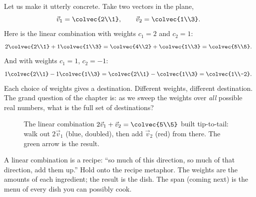Let us make it utterly concrete. Take two vectors in the plane,
\[
  \vec{v}_1 = \colvec{2\\1}, \qquad \vec{v}_2 = \colvec{1\\3}.
\]
Here is the linear combination with weights $c_1 = 2$ and $c_2 = 1$:
\[
  2\colvec{2\\1} + 1\colvec{1\\3}
  = \colvec{4\\2} + \colvec{1\\3}
  = \colvec{5\\5}.
\]
And with weights $c_1 = 1$, $c_2 = -1$:
\[
  1\colvec{2\\1} - 1\colvec{1\\3}
  = \colvec{2\\1} - \colvec{1\\3}
  = \colvec{1\\-2}.
\]
Each choice of weights gives a destination. Different weights, different destination. The grand question of the chapter is: as we sweep the weights over \emph{all} possible real numbers, what is the full set of destinations?

\begin{figure}[H]
\centering
{}
\caption{The linear combination $2\vec{v}_1 + \vec{v}_2 = \colvec{5\\5}$ built tip-to-tail: walk out $2\vec{v}_1$ (blue, doubled), then add $\vec{v}_2$ (red) from there. The green arrow is the result.}
\label{ch03:one-combo}
\end{figure}

\begin{focusbox}
A linear combination is a recipe: ``so much of this direction, so much of that direction, add them up.'' Hold onto the recipe metaphor. The weights are the amounts of each ingredient; the result is the dish. The span (coming next) is the menu of every dish you can possibly cook.
\end{focusbox}

